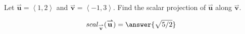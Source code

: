 \documentclass{ximera}
\author{Gregory Hartman \and Matthew Carr \and Bart Snapp}
\begin{document}
\begin{exercise}

Let $\overset{\boldsymbol{\rightharpoonup}}{\mathbf{u}} = \left< 1,2 \right>$ and $\overset{\boldsymbol{\rightharpoonup}}{\mathbf{v}} = \left< -1,3 \right>$. Find the
scalar projection of $\overset{\boldsymbol{\rightharpoonup}}{\mathbf{u}}$ along $\overset{\boldsymbol{\rightharpoonup}}{\mathbf{v}}$.
\begin{prompt}
\[
scal_{\overset{\boldsymbol{\rightharpoonup}}{\mathbf{v}}}(\overset{\boldsymbol{\rightharpoonup}}{\mathbf{u}})=\answer{\sqrt{5/2}}
\]
\end{prompt}

\end{exercise}
\end{document}
